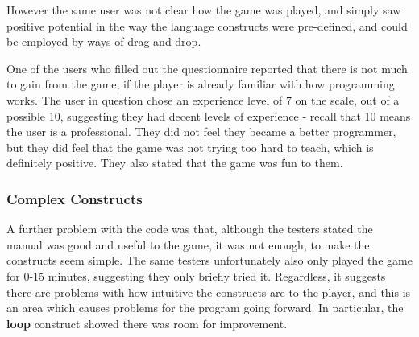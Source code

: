 However the same user was not clear how the game was played, and simply saw positive potential in the way the language constructs were pre-defined, and could be employed by ways of drag-and-drop. 


One of the users who filled out the questionnaire reported that there is not much to gain from the game, if the player is already familiar with how programming works. The user in question chose an experience level of 7 on the scale, out of a possible 10, suggesting they had decent levels of experience - recall that 10 means the user is a professional. They did not feel they became a better programmer, but they did feel that the game was not trying too hard to teach, which is definitely positive. They also stated that the game was fun to them.


\subsubsection{Complex Constructs}

A further problem with the code was that, although the testers stated the manual was good and useful to the game, it was not enough, to make the constructs seem simple. The same testers unfortunately also only played the game for 0-15 minutes, suggesting they only briefly tried it. Regardless, it suggests there are problems with how intuitive the constructs are to the player, and this is an area which causes problems for the program going forward. In particular, the \textbf{loop} construct showed there was room for improvement. 